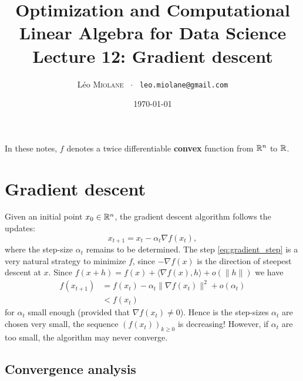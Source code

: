 \documentclass[11pt,nocut]{article}
\title{\vspace{-2.0cm}%
	Optimization and Computational Linear Algebra for Data Science\\
Lecture 12: Gradient descent}
\author{Léo \textsc{Miolane} \ $\cdot$ \ \texttt{leo.miolane@gmail.com}}
\date{\today}
\begin{document}
\maketitle


\begin{center}
In these notes, $f$ denotes a twice differentiable \textbf{convex} function from $\mathbb{R}^n$ to $\mathbb{R}$.
\end{center}

\section{Gradient descent}

Given an initial point $x_0 \in \mathbb{R}^n$, the gradient descent algorithm follows the updates:
\begin{equation}\label{eq:gradient_step}
x_{t+1} = x_t - \alpha_t \nabla f(x_t),
\end{equation}
where the step-size $\alpha_t$ remains to be determined.
The step \eqref{eq:gradient_step} is a very natural strategy to minimize $f$, since $-\nabla f(x)$ is the direction of steepest descent at $x$. Since $f(x+h) = f(x) + \langle \nabla f(x), h \rangle + o(\|h\|)$ we have
\begin{align*}
f(x_{t+1}) 
&= f(x_t) - \alpha_t \| \nabla f(x_t) \|^2 + o(\alpha_t) \\
&< f(x_t) 
\end{align*}
for $\alpha_t$ small enough (provided that $\nabla f(x_t) \neq 0$).
Hence is the step-sizes $\alpha_t$ are chosen very small, the sequence $(f(x_t))_{k \geq 0}$ is decreasing!
However, if $\alpha_t$ are too small, the algorithm may never converge.

\subsection{Convergence analysis}
\end{document}
